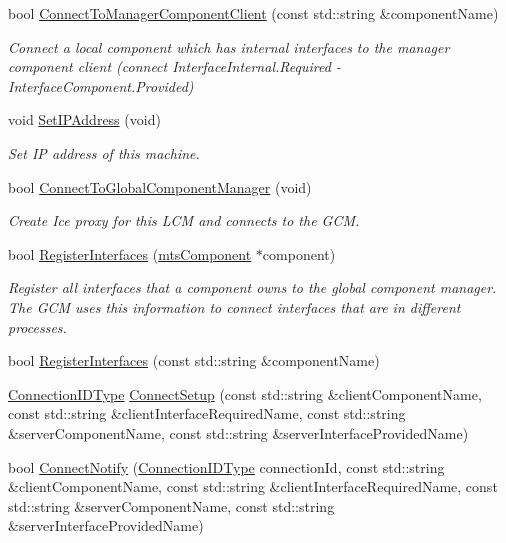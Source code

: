 \begin{DoxyCompactItemize}
bool \hyperlink{classmts_manager_local_a4750d522e6afe31cfc94684a64ae8ee5}{Connect\+To\+Manager\+Component\+Client} (const std\+::string \&component\+Name)
\begin{DoxyCompactList}\small\item\em Connect a local component which has internal interfaces to the manager component client (connect Interface\+Internal.\+Required -\/ Interface\+Component.\+Provided) \end{DoxyCompactList}\item 
void \hyperlink{classmts_manager_local_ac5e9cb62f53cfc364edb0c999fe49d54}{Set\+I\+P\+Address} (void)
\begin{DoxyCompactList}\small\item\em Set I\+P address of this machine. \end{DoxyCompactList}\item 
bool \hyperlink{classmts_manager_local_add2522aee0e994165df72ae49b624b18}{Connect\+To\+Global\+Component\+Manager} (void)
\begin{DoxyCompactList}\small\item\em Create Ice proxy for this L\+C\+M and connects to the G\+C\+M. \end{DoxyCompactList}\item 
bool \hyperlink{classmts_manager_local_a834b6553cb68326d1a10d60d79a91c9e}{Register\+Interfaces} (\hyperlink{classmts_component}{mts\+Component} $\ast$component)
\begin{DoxyCompactList}\small\item\em Register all interfaces that a component owns to the global component manager. The G\+C\+M uses this information to connect interfaces that are in different processes. \end{DoxyCompactList}\item 
bool \hyperlink{classmts_manager_local_ae41a7d305a650e91aa860cb920c2c6e9}{Register\+Interfaces} (const std\+::string \&component\+Name)
\item 
\hyperlink{mts_forward_declarations_8h_ad3543bb11742e1766374ec96016d6547}{Connection\+I\+D\+Type} \hyperlink{classmts_manager_local_acf35d5793cce2d5900d3918ec03bde52}{Connect\+Setup} (const std\+::string \&client\+Component\+Name, const std\+::string \&client\+Interface\+Required\+Name, const std\+::string \&server\+Component\+Name, const std\+::string \&server\+Interface\+Provided\+Name)
\item 
bool \hyperlink{classmts_manager_local_a351f42adc9a2e22cc0a0b2af12c15fe6}{Connect\+Notify} (\hyperlink{mts_forward_declarations_8h_ad3543bb11742e1766374ec96016d6547}{Connection\+I\+D\+Type} connection\+Id, const std\+::string \&client\+Component\+Name, const std\+::string \&client\+Interface\+Required\+Name, const std\+::string \&server\+Component\+Name, const std\+::string \&server\+Interface\+Provided\+Name)

\end{DoxyCompactItemize}
